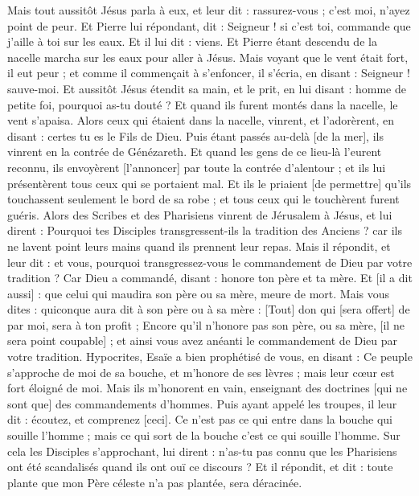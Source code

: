 \begin{multicols}{2}
Mais tout aussitôt Jésus parla à eux, et leur dit : rassurez-vous ; c'est moi, n'ayez point de peur.
Et Pierre lui répondant, dit : Seigneur ! si c'est toi, commande que j'aille à toi sur les eaux.
Et il lui dit : viens. Et Pierre étant descendu de la nacelle marcha sur les eaux pour aller à Jésus.
Mais voyant que le vent était fort, il eut peur ; et comme il commençait à s'enfoncer, il s'écria, en disant : Seigneur ! sauve-moi.
Et aussitôt Jésus étendit sa main, et le prit, en lui disant : homme de petite foi, pourquoi as-tu douté ?
Et quand ils furent montés dans la nacelle, le vent s'apaisa.
Alors ceux qui étaient dans la nacelle, vinrent, et l'adorèrent, en disant : certes tu es le Fils de Dieu.
Puis étant passés au-delà [de la mer], ils vinrent en la contrée de Génézareth.
Et quand les gens de ce lieu-là l'eurent reconnu, ils envoyèrent [l'annoncer] par toute la contrée d'alentour ; et ils lui présentèrent tous ceux qui se portaient mal.
Et ils le priaient [de permettre] qu'ils touchassent seulement le bord de sa robe ; et tous ceux qui le touchèrent furent guéris.
\VerseOne{}Alors des Scribes et des Pharisiens vinrent de Jérusalem à Jésus, et lui dirent :
Pourquoi tes Disciples transgressent-ils la tradition des Anciens ? car ils ne lavent point leurs mains quand ils prennent leur repas.
Mais il répondit, et leur dit : et vous, pourquoi transgressez-vous le commandement de Dieu par votre tradition ?
Car Dieu a commandé, disant : honore ton père et ta mère. Et [il a dit aussi] : que celui qui maudira son père ou sa mère, meure de mort.
Mais vous dites : quiconque aura dit à son père ou à sa mère : [Tout] don qui [sera offert] de par moi, sera à ton profit ;
Encore qu'il n'honore pas son père, ou sa mère, [il ne sera point coupable] ; et ainsi vous avez anéanti le commandement de Dieu par votre tradition.
Hypocrites, Esaïe a bien prophétisé de vous, en disant :
Ce peuple s'approche de moi de sa bouche, et m'honore de ses lèvres ; mais leur cœur est fort éloigné de moi.
Mais ils m'honorent en vain, enseignant des doctrines [qui ne sont que] des commandements d'hommes.
Puis ayant appelé les troupes, il leur dit : écoutez, et comprenez [ceci].
Ce n'est pas ce qui entre dans la bouche qui souille l'homme ; mais ce qui sort de la bouche c'est ce qui souille l'homme.
Sur cela les Disciples s'approchant, lui dirent : n'as-tu pas connu que les Pharisiens ont été scandalisés quand ils ont ouï ce discours ?
Et il répondit, et dit : toute plante que mon Père céleste n'a pas plantée, sera déracinée.

\end{multicols}
